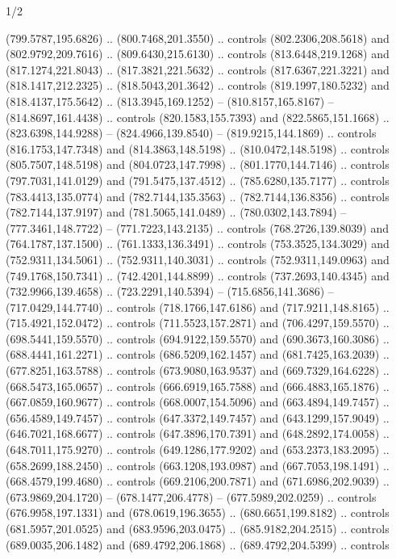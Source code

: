 \begin{flagdescription}{1/2}
\begin{scope}[shift={(2*\flaglength/3-0.25*\rb,0.51333\flagwidth)},scale=0.001715\flagwidth*\stretchfactor]
\begin{scope}[y=-1pt, x=1pt,cm={{1.04354,0.0,0.0,1.01818,(-827,-297)}}]
\begin{scope}[draw=black,line width=0.015\flagwidth]
\begin{scope}[fill=gold]
  (799.5787,195.6826) .. (800.7468,201.3550) .. controls (802.2306,208.5618) and
  (802.9792,209.7616) .. (809.6430,215.6130) .. controls (813.6448,219.1268) and
  (817.1274,221.8043) .. (817.3821,221.5632) .. controls (817.6367,221.3221) and
  (818.1417,212.2325) .. (818.5043,201.3642) .. controls (819.1997,180.5232) and
  (818.4137,175.5642) .. (813.3945,169.1252) -- (810.8157,165.8167) --
  (814.8697,161.4438) .. controls (820.1583,155.7393) and (822.5865,151.1668) ..
  (823.6398,144.9288) -- (824.4966,139.8540) -- (819.9215,144.1869) .. controls
  (816.1753,147.7348) and (814.3863,148.5198) .. (810.0472,148.5198) .. controls
  (805.7507,148.5198) and (804.0723,147.7998) .. (801.1770,144.7146) .. controls
  (797.7031,141.0129) and (791.5475,137.4512) .. (785.6280,135.7177) .. controls
  (783.4413,135.0774) and (782.7144,135.3563) .. (782.7144,136.8356) .. controls
  (782.7144,137.9197) and (781.5065,141.0489) .. (780.0302,143.7894) --
  (777.3461,148.7722) -- (771.7223,143.2135) .. controls (768.2726,139.8039) and
  (764.1787,137.1500) .. (761.1333,136.3491) .. controls (753.3525,134.3029) and
  (752.9311,134.5061) .. (752.9311,140.3031) .. controls (752.9311,149.0963) and
  (749.1768,150.7341) .. (742.4201,144.8899) .. controls (737.2693,140.4345) and
  (732.9966,139.4658) .. (723.2291,140.5394) -- (715.6856,141.3686) --
  (717.0429,144.7740) .. controls (718.1766,147.6186) and (717.9211,148.8165) ..
  (715.4921,152.0472) .. controls (711.5523,157.2871) and (706.4297,159.5570) ..
  (698.5441,159.5570) .. controls (694.9122,159.5570) and (690.3673,160.3086) ..
  (688.4441,161.2271) .. controls (686.5209,162.1457) and (681.7425,163.2039) ..
  (677.8251,163.5788) .. controls (673.9080,163.9537) and (669.7329,164.6228) ..
  (668.5473,165.0657) .. controls (666.6919,165.7588) and (666.4883,165.1876) ..
  (667.0859,160.9677) .. controls (668.0007,154.5096) and (663.4894,149.7457) ..
  (656.4589,149.7457) .. controls (647.3372,149.7457) and (643.1299,157.9049) ..
  (646.7021,168.6677) .. controls (647.3896,170.7391) and (648.2892,174.0058) ..
  (648.7011,175.9270) .. controls (649.1286,177.9202) and (653.2373,183.2095) ..
  (658.2699,188.2450) .. controls (663.1208,193.0987) and (667.7053,198.1491) ..
  (668.4579,199.4680) .. controls (669.2106,200.7871) and (671.6986,202.9039) ..
  (673.9869,204.1720) -- (678.1477,206.4778) -- (677.5989,202.0259) .. controls
  (676.9958,197.1331) and (678.0619,196.3655) .. (680.6651,199.8182) .. controls
  (681.5957,201.0525) and (683.9596,203.0475) .. (685.9182,204.2515) .. controls
  (689.0035,206.1482) and (689.4792,206.1868) .. (689.4792,204.5399) .. controls

\end{scope}
\end{scope}
\end{scope}
\end{scope}
\end{flagdescription}
